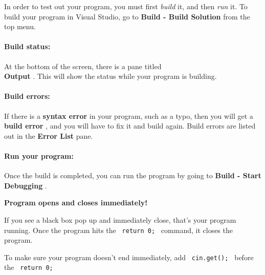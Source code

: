 \documentclass[a4paper,12pt]{book}
\begin{document}
                        In order to test out your program, you must first
                        \textit{ build } it, and then \textit{ run } it.
                        To build your program in Visual Studio, go to
                        \textbf{ Build - Build Solution } from the top menu. \\

                    \paragraph{ Build status: }
                        At the bottom of the screen, there is a pane
                        titled \\ \textbf{ Output }. This will show the status
                        while your program is building. \\

                    \paragraph{ Build errors: }
                        If there is a \textbf{ syntax error } in  your program,
                        such as a typo, then you will get a \textbf{ build error },
                        and you will have to fix it and build again. 
                        Build errors are listed out in the \textbf{ Error List } pane.

                    \paragraph{ Run your program: }

                        Once the build is completed, you can run the program
                        by going to 
                        \textbf{ Build - Start Debugging }. ~\\


                    
                        \begin{mdframed}[backgroundcolor=error]
                            \textbf{ Program opens and closes immediately! }
                            
                            If you see a black box pop up and immediately close,
                            that's your program running. Once the program hits
                            the \texttt{ return 0; } command, it closes the program.

                            To make sure your program doesn't end immediately, add
                            \texttt{ cin.get(); } before the \texttt{ return 0; }
                        \end{mdframed}
\end{document}

